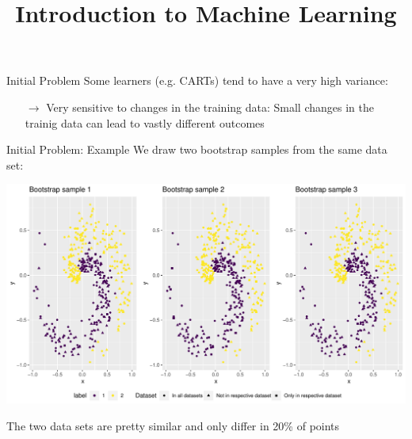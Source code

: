 




\newcommand{\titlefigure}{figure_man/forest.png}
\newcommand{\learninggoals}{
\item Understand random forests as extension of bagging
\item Understand the algorithm of random forests
\item Understand the performance evaluation of random forests
\item Understand the (dis-)advantages of random forests}

\title{Introduction to Machine Learning}
\date{}




\sloppy

\begin{vbframe}{Initial Problem}
Some learners (e.g. CARTs) tend to have a very high variance:
\begin{itemize}
  \item[$\rightarrow$] Very sensitive to changes in the training data: 
  Small changes in the trainig data can lead to vastly different outcomes
\end{itemize}
\end{vbframe}

\begin{vbframe}{Initial Problem: Example}
We draw two bootstrap samples from the same data set: 
\begin{center}
\includegraphics[height=0.60\textheight, keepaspectratio]{figure/cart_forest_overview_bs_datasets.pdf}
\end{center}
The two data sets are pretty similar and only differ in 20\% of points
\end{vbframe}



